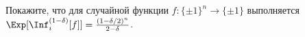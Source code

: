 Покажите, что для случайной функции $f\colon \{\pm 1\}^n \to \{\pm 1\}$ выполняется
$\Exp[\Inf_i^{(1 - \delta)}[f]] =  \frac{(1 - \delta / 2)^n}{2 - \delta}$.